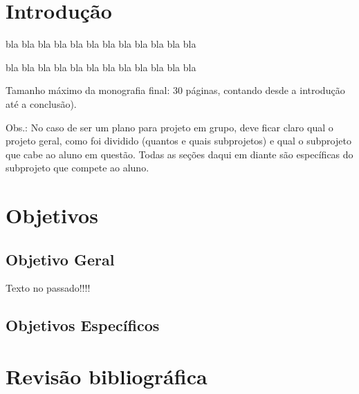 \documentclass[12pt,a4paper,espaco=umemeio,noindentfirst,oneside,openany,tocpage=plain,pnumromarab,ruledheader,time,anapcustomindent]{abntex2ppgsi}
\begin{document}
\listadefiguras

\listadetabelas

\sumario


\chapter{Introdução} %


bla bla bla bla bla bla bla bla bla bla bla bla

bla bla bla bla bla bla bla bla bla bla bla bla

{\Large Tamanho máximo da monografia final: 30 páginas, contando desde a introdução até a conclusão).

Obs.: No caso de ser um plano para projeto em grupo, deve ficar claro qual o projeto geral, como foi dividido (quantos e quais subprojetos) e qual o subprojeto que cabe ao aluno em questão. Todas as seções daqui em diante são específicas do subprojeto que compete ao aluno.}



\chapter{Objetivos}


\section{Objetivo Geral}

Texto no passado!!!!

\section{Objetivos Específicos}



\chapter{Revisão bibliográfica}
\end{document}
